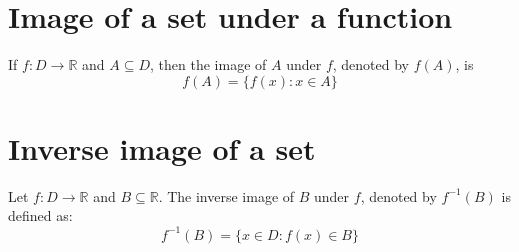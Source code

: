 \section{Image of a set under a function}
\begin{definition} If $f:D\rightarrow\mathbb{R}$ and $A\subseteq D$, then the image of $A$ under $f$, denoted by $f(A)$, is
\[
f(A) = \{f(x) : x\in A\}
\]

\end{definition}

\section{Inverse image of a set}
\begin{definition} Let $f:D\rightarrow\mathbb{R}$ and $B\subseteq\mathbb{R}$.  The inverse image of $B$ under $f$, denoted by $f^{-1}(B)$ is defined as:
\[
f^{-1}(B) = \{x\in D : f(x)\in B\}
\]
\end{definition}




